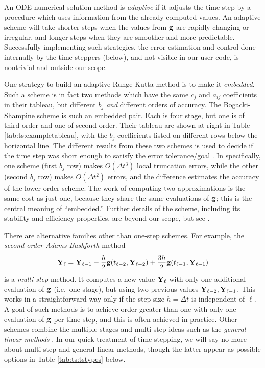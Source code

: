 An ODE numerical solution method is \emph{adaptive} if it adjusts the time step by a procedure which uses information from the already-computed values.  An adaptive scheme will take shorter steps when the values from $\mathbf{g}$ are rapidly-changing or irregular, and longer steps when they are smoother and more predictable.  Successfully implementing such strategies, the error estimation and control \citep{AscherPetzold1998} done internally by the \PETSc time-steppers (below), and not visible in our user code, is nontrivial and outside our scope.

One strategy to build an adaptive Runge-Kutta method is to make it \emph{embedded}.  Such a scheme is in fact two methods which have the same $c_j$ and $a_{ij}$ coefficients in their tableau, but different $b_j$ \emph{and} different orders of accuracy.  The Bogacki-Shampine scheme \RKthreebs is such an embedded pair.  Each is four stage, but one is of third order and one of second order.  Their tableau are shown at right in Table \ref{tab:ts:exampletableau}, with the $b_j$ coefficients listed on different rows below the horizontal line.  The different results from these two schemes is used to decide if the time step was short enough to satisfy the error tolerance/goal \citep{Butcher2008}.  In \RKthreebs specifically, one scheme (first $b_j$ row) makes $O(\Delta t^3)$ local truncation errors, while the other (second $b_j$ row) makes $O(\Delta t^2)$ errors, and the difference estimates the accuracy of the lower order scheme.  The work of computing two approximations is the same cost as just one, because they share the same evaluations of $\mathbf{g}$; this is the central meaning of ``embedded.''  Further details of the \RKthreebs scheme, including its stability and efficiency properties, are beyond our scope, but see \citep{BogackiShampine1989}.

There are alternative families other than one-step schemes.  For example, the \emph{second-order Adams-Bashforth} method
\begin{equation}
\mathbf{Y}_\ell = \mathbf{Y}_{\ell-1} - \frac{h}{2} \mathbf{g}(t_{\ell-2},\mathbf{Y}_{\ell-2}) + \frac{3 h}{2} \mathbf{g}(t_{\ell-1},\mathbf{Y}_{\ell-1})  \label{eq:ts:ab2}
\end{equation}
is a \emph{multi-step} method.  It computes a new value $\mathbf{Y}_\ell$ with only one additional evaluation of $\mathbf{g}$ (i.e.~one stage), but using two previous values $\mathbf{Y}_{\ell-2},\mathbf{Y}_{\ell-1}$.  This works in a straightforward way only if the step-size $h=\Delta t$ is independent of $\ell$.  A goal of such methods is to achieve order greater than one with only one evaluation of $\mathbf{g}$ per time step, and this is often achieved in practice.  Other schemes combine the multiple-stages and multi-step ideas such as the \emph{general linear methods} \citep{Butcher2008}.  In our quick treatment of time-stepping, we will say no more about multi-step and general linear methods, though the latter appear as possible \PETSc options in Table \ref{tab:ts:tstypes} below.

